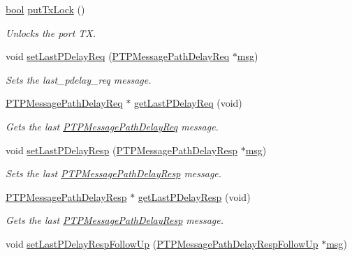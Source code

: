 \begin{DoxyCompactItemize}
\hyperlink{avb__gptp_8h_af6a258d8f3ee5206d682d799316314b1}{bool} \hyperlink{class_ether_port_a43b92f952fdff70f6e8b5b8f4302c7d9}{put\+Tx\+Lock} ()
\begin{DoxyCompactList}\small\item\em Unlocks the port TX. \end{DoxyCompactList}\item 
void \hyperlink{class_ether_port_ab25cd9729b7a0cba720227a1f117609e}{set\+Last\+P\+Delay\+Req} (\hyperlink{class_p_t_p_message_path_delay_req}{P\+T\+P\+Message\+Path\+Delay\+Req} $\ast$\hyperlink{openavb__log_8c_a0c7e58a50354c4a4d6dad428d0e47029}{msg})
\begin{DoxyCompactList}\small\item\em Sets the last\+\_\+pdelay\+\_\+req message. \end{DoxyCompactList}\item 
\hyperlink{class_p_t_p_message_path_delay_req}{P\+T\+P\+Message\+Path\+Delay\+Req} $\ast$ \hyperlink{class_ether_port_a0a0c05dbfb82e5eeacca5a4b05153c6c}{get\+Last\+P\+Delay\+Req} (void)
\begin{DoxyCompactList}\small\item\em Gets the last \hyperlink{class_p_t_p_message_path_delay_req}{P\+T\+P\+Message\+Path\+Delay\+Req} message. \end{DoxyCompactList}\item 
void \hyperlink{class_ether_port_aff0c294fbf32518c1052608858947a94}{set\+Last\+P\+Delay\+Resp} (\hyperlink{class_p_t_p_message_path_delay_resp}{P\+T\+P\+Message\+Path\+Delay\+Resp} $\ast$\hyperlink{openavb__log_8c_a0c7e58a50354c4a4d6dad428d0e47029}{msg})
\begin{DoxyCompactList}\small\item\em Sets the last \hyperlink{class_p_t_p_message_path_delay_resp}{P\+T\+P\+Message\+Path\+Delay\+Resp} message. \end{DoxyCompactList}\item 
\hyperlink{class_p_t_p_message_path_delay_resp}{P\+T\+P\+Message\+Path\+Delay\+Resp} $\ast$ \hyperlink{class_ether_port_a3afa6852a50e5e448a00418873a59eb1}{get\+Last\+P\+Delay\+Resp} (void)
\begin{DoxyCompactList}\small\item\em Gets the last \hyperlink{class_p_t_p_message_path_delay_resp}{P\+T\+P\+Message\+Path\+Delay\+Resp} message. \end{DoxyCompactList}\item 
void \hyperlink{class_ether_port_a3fda8f9b8062143325749e9a76cd24e4}{set\+Last\+P\+Delay\+Resp\+Follow\+Up} (\hyperlink{class_p_t_p_message_path_delay_resp_follow_up}{P\+T\+P\+Message\+Path\+Delay\+Resp\+Follow\+Up} $\ast$\hyperlink{openavb__log_8c_a0c7e58a50354c4a4d6dad428d0e47029}{msg})

\end{DoxyCompactItemize}
